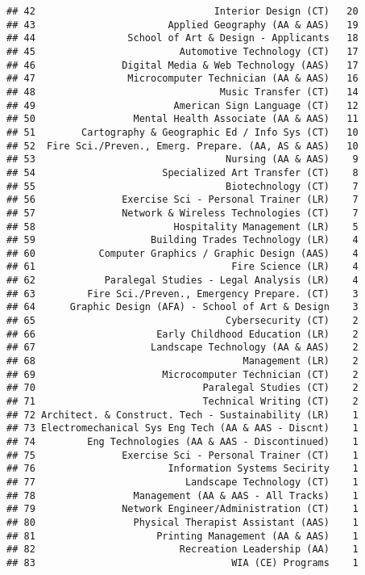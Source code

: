 \documentclass[]{article}
\begin{document}
\begin{verbatim}
## 42                               Interior Design (CT)   20
## 43                       Applied Geography (AA & AAS)   19
## 44                School of Art & Design - Applicants   18
## 45                         Automotive Technology (CT)   17
## 46               Digital Media & Web Technology (AAS)   17
## 47                Microcomputer Technician (AA & AAS)   16
## 48                                Music Transfer (CT)   14
## 49                        American Sign Language (CT)   12
## 50                 Mental Health Associate (AA & AAS)   11
## 51        Cartography & Geographic Ed / Info Sys (CT)   10
## 52  Fire Sci./Preven., Emerg. Prepare. (AA, AS & AAS)   10
## 53                                 Nursing (AA & AAS)    9
## 54                      Specialized Art Transfer (CT)    8
## 55                                 Biotechnology (CT)    7
## 56               Exercise Sci - Personal Trainer (LR)    7
## 57               Network & Wireless Technologies (CT)    7
## 58                        Hospitality Management (LR)    5
## 59                    Building Trades Technology (LR)    4
## 60           Computer Graphics / Graphic Design (AAS)    4
## 61                                  Fire Science (LR)    4
## 62            Paralegal Studies - Legal Analysis (LR)    4
## 63         Fire Sci./Preven., Emergency Prepare. (CT)    3
## 64      Graphic Design (AFA) - School of Art & Design    3
## 65                                 Cybersecurity (CT)    2
## 66                     Early Childhood Education (LR)    2
## 67                    Landscape Technology (AA & AAS)    2
## 68                                    Management (LR)    2
## 69                      Microcomputer Technician (CT)    2
## 70                             Paralegal Studies (CT)    2
## 71                             Technical Writing (CT)    2
## 72 Architect. & Construct. Tech - Sustainability (LR)    1
## 73 Electromechanical Sys Eng Tech (AA & AAS - Discnt)    1
## 74         Eng Technologies (AA & AAS - Discontinued)    1
## 75               Exercise Sci - Personal Trainer (CT)    1
## 76                       Information Systems Secirity    1
## 77                          Landscape Technology (CT)    1
## 78                 Management (AA & AAS - All Tracks)    1
## 79               Network Engineer/Administration (CT)    1
## 80                 Physical Therapist Assistant (AAS)    1
## 81                     Printing Management (AA & AAS)    1
## 82                         Recreation Leadership (AA)    1
## 83                                  WIA (CE) Programs    1

\end{verbatim}
\end{document}
